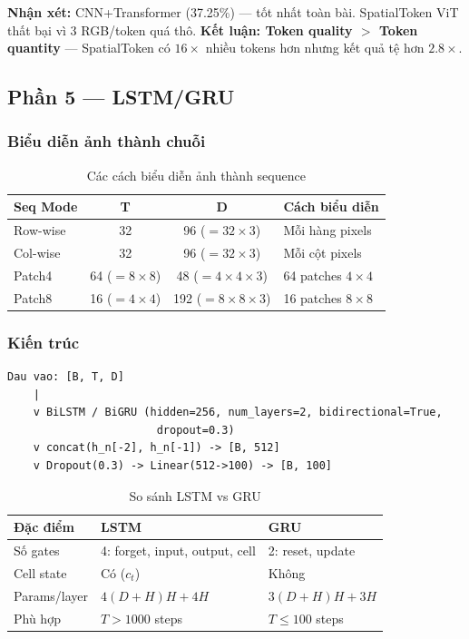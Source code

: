 \documentclass[12pt, a4paper]{article}
\begin{document}
\textbf{Nhận xét:} CNN+Transformer (37.25\%) --- tốt nhất toàn bài. SpatialToken ViT thất bại vì 3 RGB/token quá thô. \textbf{Kết luận: Token quality $>$ Token quantity} --- SpatialToken có $16\times$ nhiều tokens hơn nhưng kết quả tệ hơn $2.8\times$.

\subsection{Phần 5 --- LSTM/GRU}

\subsubsection{Biểu diễn ảnh thành chuỗi}

\begin{table}[H]
\centering
\caption{Các cách biểu diễn ảnh thành sequence}
\begin{tabular}{lccl}
\toprule
\textbf{Seq Mode} & \textbf{T} & \textbf{D} & \textbf{Cách biểu diễn} \\
\midrule
Row-wise  & 32 & 96 ($=32\times3$)   & Mỗi hàng pixels \\
Col-wise  & 32 & 96 ($=32\times3$)   & Mỗi cột pixels \\
Patch4    & 64 ($=8\times8$) & 48 ($=4\times4\times3$) & 64 patches $4\times4$ \\
Patch8    & 16 ($=4\times4$) & 192 ($=8\times8\times3$) & 16 patches $8\times8$ \\
\bottomrule
\end{tabular}
\end{table}

\subsubsection{Kiến trúc}

\begin{lstlisting}[style=plainstyle]
Dau vao: [B, T, D]
    |
    v BiLSTM / BiGRU (hidden=256, num_layers=2, bidirectional=True,
                       dropout=0.3)
    v concat(h_n[-2], h_n[-1]) -> [B, 512]
    v Dropout(0.3) -> Linear(512->100) -> [B, 100]
\end{lstlisting}

\begin{table}[H]
\centering
\caption{So sánh LSTM vs GRU}
\begin{tabular}{lll}
\toprule
\textbf{Đặc điểm} & \textbf{LSTM} & \textbf{GRU} \\
\midrule
Số gates        & 4: forget, input, output, cell & 2: reset, update \\
Cell state      & Có ($c_t$)  & Không \\
Params/layer    & $4(D+H)H+4H$ & $3(D+H)H+3H$ \\
Phù hợp         & $T>1000$ steps & $T\leq100$ steps \\
\bottomrule
\end{tabular}
\end{table}
\end{document}
